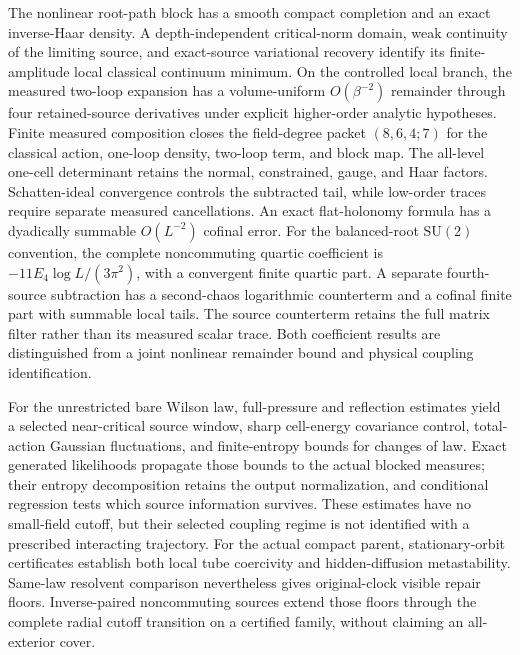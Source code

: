 \documentclass[11pt,oneside,openany]{book}
\theoremstyle{definition}
\theoremstyle{remark}
\newcommand{\SU}{\mathrm{SU}}
\begin{document}
The nonlinear root-path block has a smooth compact completion and an
exact inverse-Haar density. A depth-independent critical-norm domain,
weak continuity of the limiting source, and exact-source variational
recovery identify its finite-amplitude local classical continuum
minimum. On the controlled local branch, the measured two-loop
expansion has a volume-uniform $O(\beta^{-2})$ remainder through four
retained-source derivatives under explicit higher-order analytic
hypotheses. Finite measured composition closes the field-degree packet
$(8,6,4;7)$ for the classical action, one-loop density, two-loop term,
and block map. The all-level one-cell determinant retains the normal,
constrained, gauge, and Haar factors. Schatten-ideal convergence controls the subtracted
tail, while low-order traces require separate measured cancellations.
An exact flat-holonomy formula has a dyadically summable $O(L^{-2})$
cofinal error. For the balanced-root $\SU(2)$ convention, the complete
noncommuting quartic coefficient is
$-11E_4\log L/(3\pi^2)$, with a convergent finite quartic part.
A separate fourth-source subtraction has a second-chaos logarithmic
counterterm and a cofinal finite part with summable local tails.
The source counterterm retains the full matrix filter rather than its
measured scalar trace. Both coefficient results are distinguished from
a joint nonlinear remainder bound and physical coupling identification.

For the unrestricted bare Wilson law, full-pressure and reflection
estimates yield a selected near-critical source window, sharp
cell-energy covariance control, total-action Gaussian fluctuations,
and finite-entropy bounds for changes of law. Exact generated
likelihoods propagate those bounds to the actual blocked measures;
their entropy decomposition retains the output normalization, and
conditional regression tests which source information survives.
These estimates have no small-field cutoff, but their selected coupling
regime is not identified with a prescribed interacting trajectory. For the actual
compact parent, stationary-orbit certificates establish both local
tube coercivity and hidden-diffusion metastability. Same-law resolvent
comparison nevertheless gives original-clock visible repair floors.
Inverse-paired noncommuting sources extend those floors through the
complete radial cutoff transition on a certified family, without
claiming an all-exterior cover.
\end{document}
